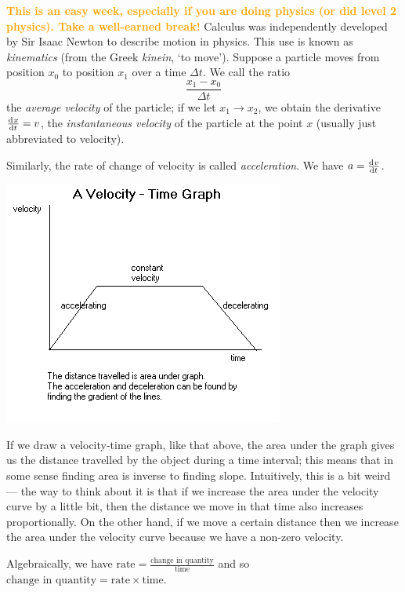 


\textcolor{orange}{\textbf{This is an easy week, especially if you are doing physics (or did level 2 physics). Take a well-earned break!}}
Calculus was independently developed by Sir Isaac Newton to describe motion in physics. This use is known as \textit{kinematics} (from the
Greek \textit{kinein}, `to move'). Suppose a particle moves from position $ x_0 $ to position $ x_1 $ over a time $ \Delta t $. We call the
ratio
\begin{displaymath}
  \frac{x_1 - x_0}{\Delta t}
\end{displaymath}
the \textit{average velocity} of the particle; if we let $ x_1 \to x_2 $, we obtain the derivative $ \od{x}{t} = v $, the \textit{instantaneous
velocity} of the particle at the point $ x $ (usually just abbreviated to velocity).

Similarly, the rate of change of velocity is called \textit{acceleration}. We have $ a = \od{v}{t} $.

\begin{center}
  \includegraphics[width=0.5\linewidth]{vgraph}
\end{center}
If we draw a velocity-time graph, like that above, the area under the graph gives us the distance travelled by the object
during a time interval; this means that in some sense finding area is inverse to finding slope. Intuitively, this is a bit
weird --- the way to think about it is that if we increase the area under the velocity curve by a little bit, then the distance
we move in that time also increases proportionally. On the other hand, if we move a certain distance then we increase the area
under the velocity curve because we have a non-zero velocity.

Algebraically, we have $ \text{rate} = \frac{\text{change in quantity}}{\text{time}} $ and so $ \text{change in quantity} = \text{rate} \times \text{time} $.

